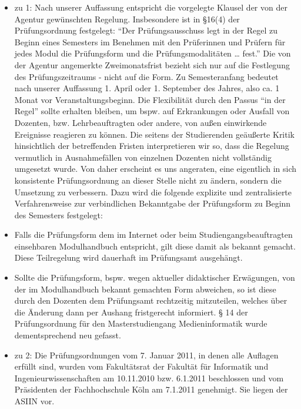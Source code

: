 \begin{itemize}
\tightlist
\item
  zu 1: Nach unserer Auffassung entspricht die vorgelegte Klausel der
  von der Agentur gewünschten Regelung. Insbesondere ist in §16(4) der
  Prüfungsordnung festgelegt: ``Der Prüfungsausschuss legt in der Regel
  zu Beginn eines Semesters im Benehmen mit den Prüferinnen und Prüfern
  für jedes Modul die Prüfungsform und die Prüfungsmodalitäten \ldots{}
  fest.'' Die von der Agentur angemerkte Zweimonatsfrist bezieht sich
  nur auf die Festlegung des Prüfungszeitraums - nicht auf die Form. Zu
  Semesteranfang bedeutet nach unserer Auffassung 1. April oder 1.
  September des Jahres, also ca. 1 Monat vor Veranstaltungsbeginn. Die
  Flexibilität durch den Passus ``in der Regel'' sollte erhalten
  bleiben, um bspw. auf Erkrankungen oder Ausfall von Dozenten, bzw.
  Lehrbeauftragten oder andere, von außen einwirkende Ereignisse
  reagieren zu können. Die seitens der Studierenden geäußerte Kritik
  hinsichtlich der betreffenden Fristen interpretieren wir so, dass die
  Regelung vermutlich in Ausnahmefällen von einzelnen Dozenten nicht
  vollständig umgesetzt wurde. Von daher erscheint es uns angeraten,
  eine eigentlich in sich konsistente Prüfungsordnung an dieser Stelle
  nicht zu ändern, sondern die Umsetzung zu verbessern. Dazu wird die
  folgende explizite und zentralisierte Verfahrensweise zur
  verbindlichen Bekanntgabe der Prüfungsform zu Beginn des Semesters
  festgelegt:
\item
  Falls die Prüfungsform dem im Internet oder beim
  Studiengangsbeauftragten einsehbaren Modulhandbuch entspricht, gilt
  diese damit als bekannt gemacht. Diese Teilregelung wird dauerhaft im
  Prüfungsamt ausgehängt.
\item
  Sollte die Prüfungsform, bspw. wegen aktueller didaktischer
  Erwägungen, von der im Modulhandbuch bekannt gemachten Form abweichen,
  so ist diese durch den Dozenten dem Prüfungsamt rechtzeitig
  mitzuteilen, welches über die Änderung dann per Aushang fristgerecht
  informiert. § 14 der Prüfungsordnung für den Masterstudiengang
  Medieninformatik wurde dementsprechend neu gefasst.
\item
  zu 2: Die Prüfungsordnungen vom 7. Januar 2011, in denen alle Auflagen
  erfüllt sind, wurden vom Fakultätsrat der Fakultät für Informatik und
  Ingenieurwissenschaften am 10.11.2010 bzw. 6.1.2011 beschlossen und
  vom Präsidenten der Fachhochschule Köln am 7.1.2011 genehmigt. Sie
  liegen der ASIIN vor.
\end{itemize}

